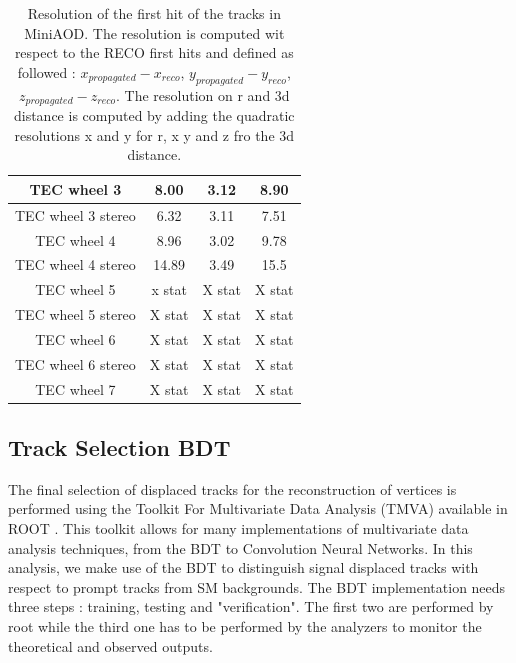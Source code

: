 \documentclass{cernatlasnote}
\begin{document}
\begin{table}
\begin{tabular}{|c|c|c|c|}
          \hline
         TEC wheel 3 & 8.00 & 3.12 & 8.90\\
          \hline
         TEC wheel 3 stereo & 6.32 & 3.11 &  7.51\\
          \hline
         TEC wheel 4 & 8.96 & 3.02 & 9.78\\
          \hline
         TEC wheel 4 stereo & 14.89 & 3.49 & 15.5\\
          \hline
         TEC wheel 5 & x stat &  X stat  &  X stat\\
          \hline
         TEC wheel 5 stereo & X stat & X stat &  X stat\\
          \hline
         TEC wheel 6 & X stat & X stat & X stat\\
          \hline
         TEC wheel 6 stereo & X stat & X stat & X stat\\
          \hline
         TEC wheel 7 & X stat & X stat & X stat\\
        \hline
    \end{tabular}
    \caption{Resolution of the first hit  of the tracks in MiniAOD. The resolution is computed wit respect to the RECO first hits and defined as followed : $x_{propagated}-x_{reco}$, $y_{propagated}-y_{reco}$,$z_{propagated}-z_{reco}$. The resolution on r and 3d distance is computed by adding the quadratic resolutions x and y for r, x y and z fro the 3d distance.}
    \label{tab:FIRSTHITRES}
\end{table}

 \pagebreak
\subsection{Track Selection BDT}
\label{APP: TRKBDT}
 The final selection of displaced tracks for the reconstruction of vertices is performed using the Toolkit For Multivariate Data Analysis (TMVA) available in ROOT \cite{hoecker2009tmvatoolkitmultivariate}. This toolkit allows for many implementations of multivariate data analysis techniques, from the BDT to Convolution Neural Networks. In this analysis, we make use of the BDT to distinguish signal displaced tracks with respect to prompt tracks from SM backgrounds.  The BDT implementation needs three steps : training, testing and "verification". The first two are performed by root while the third one has to be performed by the analyzers to monitor the theoretical and observed outputs.\\
 
\end{document}

